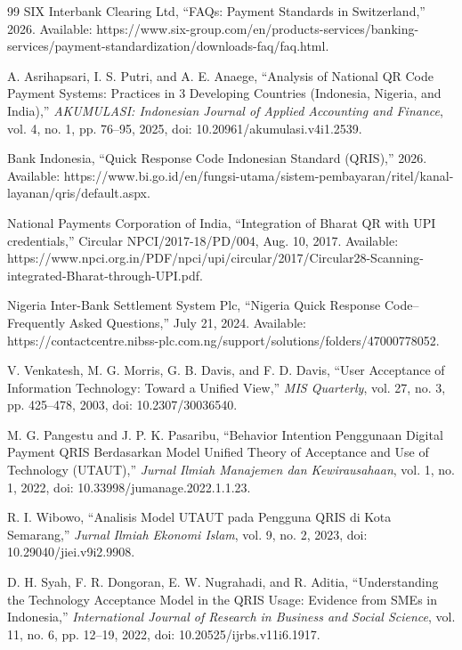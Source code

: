 \begin{thebibliography}{99}
SIX Interbank Clearing Ltd, ``FAQs: Payment Standards in Switzerland,'' 2026. Available: https://www.six-group.com/en/products-services/banking-services/payment-standardization/downloads-faq/faq.html.

A. Asrihapsari, I. S. Putri, and A. E. Anaege, ``Analysis of National QR Code Payment Systems: Practices in 3 Developing Countries (Indonesia, Nigeria, and India),'' \textit{AKUMULASI: Indonesian Journal of Applied Accounting and Finance}, vol. 4, no. 1, pp. 76--95, 2025, doi: 10.20961/akumulasi.v4i1.2539.

Bank Indonesia, ``Quick Response Code Indonesian Standard (QRIS),'' 2026. Available: https://www.bi.go.id/en/fungsi-utama/sistem-pembayaran/ritel/kanal-layanan/qris/default.aspx.

National Payments Corporation of India, ``Integration of Bharat QR with UPI credentials,'' Circular NPCI/2017-18/PD/004, Aug. 10, 2017. Available: https://www.npci.org.in/PDF/npci/upi/circular/2017/Circular28-Scanning-integrated-Bharat-through-UPI.pdf.

Nigeria Inter-Bank Settlement System Plc, ``Nigeria Quick Response Code--Frequently Asked Questions,'' July 21, 2024. Available: https://contactcentre.nibss-plc.com.ng/support/solutions/folders/47000778052.

V. Venkatesh, M. G. Morris, G. B. Davis, and F. D. Davis, ``User Acceptance of Information Technology: Toward a Unified View,'' \textit{MIS Quarterly}, vol. 27, no. 3, pp. 425--478, 2003, doi: 10.2307/30036540.

M. G. Pangestu and J. P. K. Pasaribu, ``Behavior Intention Penggunaan Digital Payment QRIS Berdasarkan Model Unified Theory of Acceptance and Use of Technology (UTAUT),'' \textit{Jurnal Ilmiah Manajemen dan Kewirausahaan}, vol. 1, no. 1, 2022, doi: 10.33998/jumanage.2022.1.1.23.

R. I. Wibowo, ``Analisis Model UTAUT pada Pengguna QRIS di Kota Semarang,'' \textit{Jurnal Ilmiah Ekonomi Islam}, vol. 9, no. 2, 2023, doi: 10.29040/jiei.v9i2.9908.

D. H. Syah, F. R. Dongoran, E. W. Nugrahadi, and R. Aditia, ``Understanding the Technology Acceptance Model in the QRIS Usage: Evidence from SMEs in Indonesia,'' \textit{International Journal of Research in Business and Social Science}, vol. 11, no. 6, pp. 12--19, 2022, doi: 10.20525/ijrbs.v11i6.1917.


\end{thebibliography}
